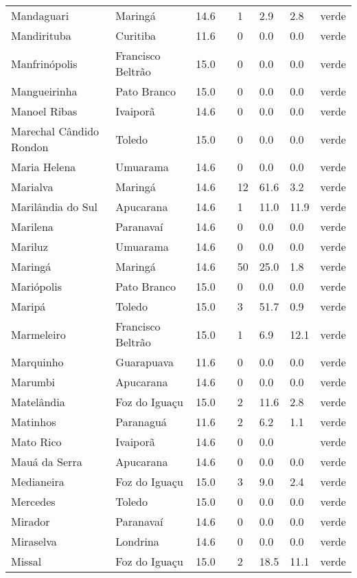 \begin{longtable}{l|lllllll}
  Mandaguari & Maringá & 14.6 &  & 1 & 2.9 & 2.8 & verde \\ 
  Mandirituba & Curitiba & 11.6 &  & 0 & 0.0 & 0.0 & verde \\ 
  Manfrinópolis & Francisco Beltrão & 15.0 &  & 0 & 0.0 & 0.0 & verde \\ 
  Mangueirinha & Pato Branco & 15.0 &  & 0 & 0.0 & 0.0 & verde \\ 
  Manoel Ribas & Ivaiporã & 14.6 &  & 0 & 0.0 & 0.0 & verde \\ 
  Marechal Cândido Rondon & Toledo & 15.0 &  & 0 & 0.0 & 0.0 & verde \\ 
  Maria Helena & Umuarama & 14.6 &  & 0 & 0.0 & 0.0 & verde \\ 
  Marialva & Maringá & 14.6 &  & 12 & 61.6 & 3.2 & verde \\ 
  Marilândia do Sul & Apucarana & 14.6 &  & 1 & 11.0 & 11.9 & verde \\ 
  Marilena & Paranavaí & 14.6 &  & 0 & 0.0 & 0.0 & verde \\ 
  Mariluz & Umuarama & 14.6 &  & 0 & 0.0 & 0.0 & verde \\ 
  Maringá & Maringá & 14.6 &  & 50 & 25.0 & 1.8 & verde \\ 
  Mariópolis & Pato Branco & 15.0 &  & 0 & 0.0 & 0.0 & verde \\ 
  Maripá & Toledo & 15.0 &  & 3 & 51.7 & 0.9 & verde \\ 
  Marmeleiro & Francisco Beltrão & 15.0 &  & 1 & 6.9 & 12.1 & verde \\ 
  Marquinho & Guarapuava & 11.6 &  & 0 & 0.0 & 0.0 & verde \\ 
  Marumbi & Apucarana & 14.6 &  & 0 & 0.0 & 0.0 & verde \\ 
  Matelândia & Foz do Iguaçu & 15.0 &  & 2 & 11.6 & 2.8 & verde \\ 
  Matinhos & Paranaguá & 11.6 &  & 2 & 6.2 & 1.1 & verde \\ 
  Mato Rico & Ivaiporã & 14.6 &  & 0 & 0.0 &  & verde \\ 
  Mauá da Serra & Apucarana & 14.6 &  & 0 & 0.0 & 0.0 & verde \\ 
  Medianeira & Foz do Iguaçu & 15.0 &  & 3 & 9.0 & 2.4 & verde \\ 
  Mercedes & Toledo & 15.0 &  & 0 & 0.0 & 0.0 & verde \\ 
  Mirador & Paranavaí & 14.6 &  & 0 & 0.0 & 0.0 & verde \\ 
  Miraselva & Londrina & 14.6 &  & 0 & 0.0 & 0.0 & verde \\ 
  Missal & Foz do Iguaçu & 15.0 &  & 2 & 18.5 & 11.1 & verde \\ 

\end{longtable}
